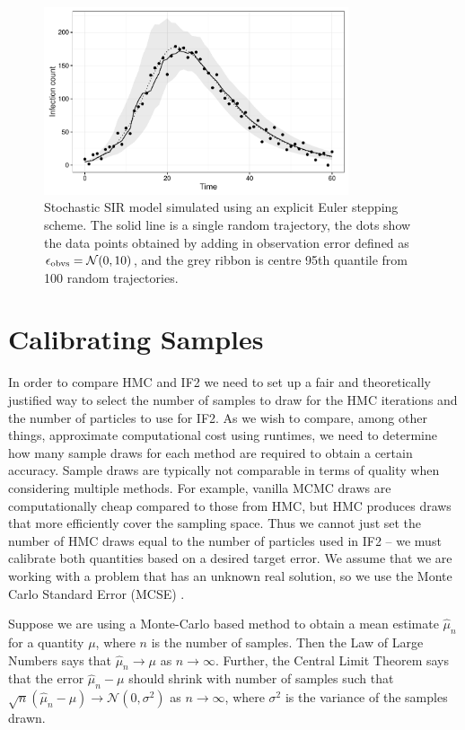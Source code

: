     \begin{figure}
        \centering
        \captionsetup{width=.8\linewidth}
        \includegraphics[width=0.8\textwidth]{./images/sirmean.pdf}
        \caption{Stochastic SIR model simulated using an explicit Euler stepping scheme. The solid line is a single random trajectory, the dots show the data points obtained by adding in observation error defined as $\epsilon_{\small\text{obvs}} = \mathcal{N}(0,10)$, and the grey ribbon is centre 95th quantile from 100 random trajectories. \label{sirmean}}
    \end{figure}


\section{Calibrating Samples}

	In order to compare HMC and IF2 we need to set up a fair and theoretically justified way to select the number of samples to draw for the HMC iterations and the number of particles to use for IF2. As we wish to compare, among other things, approximate computational cost using runtimes, we need to determine how many sample draws for each method are required to obtain a certain accuracy. Sample draws are typically not comparable in terms of quality when considering multiple methods. For example, vanilla MCMC draws are computationally cheap compared to those from HMC, but HMC produces draws that more efficiently cover the sampling space. Thus we cannot just set the number of HMC draws equal to the number of particles used in IF2 -- we must calibrate both quantities based on a desired target error. We assume that we are working with a problem that has an unknown real solution, so we use the Monte Carlo Standard Error (MCSE) \cite{Harding2014}.

	Suppose we are using a Monte-Carlo based method to obtain a mean estimate $\hat{\mu}_{n}$ for a quantity $\mu$, where $n$ is the number of samples. Then the Law of Large Numbers says that $\hat{\mu}_{n} \rightarrow \mu$ as $n \rightarrow \infty$. Further, the Central Limit Theorem says that the error $\hat{\mu}_{n} - \mu$ should shrink with number of samples such that $\sqrt{n} (\hat{\mu}_{n} - \mu) \rightarrow \mathcal{N}(0,\sigma^2)$ as $n \rightarrow \infty$, where $\sigma^2$ is the variance of the samples drawn.

